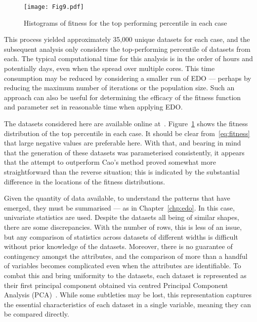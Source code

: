\begin{figure}
    \centering
    \texttt{[image: Fig9.pdf]}
    \caption{%
        Histograms of fitness for the top performing percentile in each case
    }\label{fig:fitness}
\end{figure}

This process yielded approximately 35,000 unique datasets for each case, and the
subsequent analysis only considers the top-performing percentile of datasets
from each. The typical computational time for this analysis is in the order of
hours and potentially days, even when the spread over multiple cores. This time
consumption may be reduced by considering a smaller run of EDO --- perhaps by
reducing the maximum number of iterations or the population size. Such an
approach can also be useful for determining the efficacy of the fitness function
and parameter set in reasonable time when applying EDO.

The datasets considered here are available online
at~. Figure~\ref{fig:fitness} shows the fitness
distribution of the top percentile in each case. It should be clear
from~\eqref{eq:fitness} that large negative values are preferable here. With
that, and bearing in mind that the generation of these datasets was
parameterised consistently, it appears that the attempt to outperform Cao's
method proved somewhat more straightforward than the reverse situation; this is
indicated by the substantial difference in the locations of the fitness
distributions.

Given the quantity of data available, to understand the patterns that have
emerged, they must be summarised --- as in Chapter~\ref{chp:edo}. In this case,
univariate statistics are used. Despite the datasets all being of similar
shapes, there are some discrepancies. With the number of rows, this is less of
an issue, but any comparison of statistics across datasets of different widths
is difficult without prior knowledge of the datasets. Moreover, there is no
guarantee of contingency amongst the attributes, and the comparison of more than
a handful of variables becomes complicated even when the attributes are
identifiable. To combat this and bring uniformity to the datasets, each dataset
is represented as their first principal component obtained via centred Principal
Component Analysis (PCA)~\cite{Jolliffe1986}. While some subtleties may be lost,
this representation captures the essential characteristics of each dataset in a
single variable, meaning they can be compared directly.

